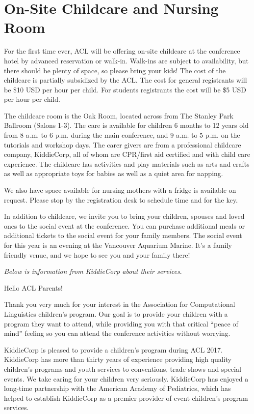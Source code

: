 \chapter{On-Site Childcare and Nursing Room}


For the first time ever, ACL will be offering on-site childcare at the conference hotel by advanced reservation or walk-in.   Walk-ins are subject to availability, but there should be plenty of space, so please bring your kids!  The cost of the childcare is partially subsidized by the ACL. The cost for general registrants will be \$10 USD per hour per child. For students registrants the cost will be \$5 USD per hour per child.

The childcare room is the Oak Room, located across from The Stanley Park Ballroom (Salons 1-3). The care is available for children 6 months to 12 years old from 8 a.m. to 6 p.m. during the main conference, and  9 a.m. to 5 p.m. on the tutorials and workshop days. The carer givers are from a professional childcare company, KiddieCorp, all of whom are CPR/first aid certified and with child care experience. The childcare has activities and play materials such as arts and crafts as well as appropriate toys for babies as well as a quiet area for napping.  

We also have space available for nursing mothers with a fridge is available on request. Please stop by the registration desk to schedule time and for the key.

In addition to childcare, we invite you to bring your children, spouses and loved ones to the social event at the conference. You can purchase additional meals or additional tickets to the social event for your family members. The social event for this year is an evening at the Vancouver Aquarium Marine. It's a family friendly venue, and we hope to see you and your family there!

\emph{Below is information from KiddieCorp about their services.}

Hello ACL Parents!
 
Thank you very much for your interest in the Association for Computational Linguistics children's program. Our goal is to provide your children with a program they want to attend, while providing you with that critical ``peace of mind'' feeling so you can attend the conference activities without worrying.

KiddieCorp is pleased to provide a children's program during ACL 2017. KiddieCorp has more than thirty years of experience providing high quality children's programs and youth services to conventions, trade shows and special events. We take caring for your children very seriously. KiddieCorp has enjoyed a long-time partnership with the American Academy of Pediatrics, which has helped to establish KiddieCorp as a premier provider of event children's program services.

